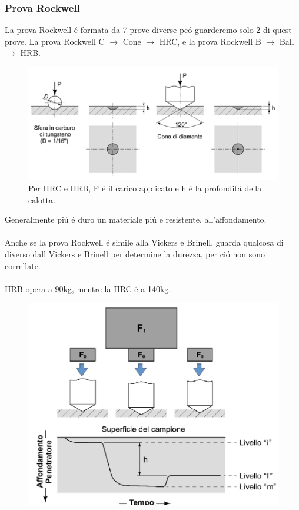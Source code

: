 \documentclass{article}
\begin{document}
{                \subsubsection{Prova Rockwell}
                    La prova Rockwell \'e formata da 7 prove diverse pe\'o guarderemo solo 2 di quest prove. La prova Rockwell C $\rightarrow$ Cone $\rightarrow$ HRC, e la prova Rockwell B $\rightarrow$ Ball $\rightarrow$ HRB.
                    \begin{figure}[!h]
                        \centering
                        \includegraphics[width=.85\linewidth]{Diagrammi per le Prova di Durezza Rockwell.png}
                        \caption{Per HRC e HRB, P \'e il carico applicato e h \'e la profondit\'a della calotta.}
                    \end{figure}
                     Generalmente pi\'u \'e duro un materiale pi\'u e resistente. all'affondamento. \\ \\
                    Anche se la prova Rockwell \'e simile alla Vickers e Brinell, guarda qualcosa di diverso dall Vickers e Brinell per determine la durezza, per ci\'o non sono correllate.\\ \\
                    HRB opera a 90kg, mentre la HRC \'e a 140kg.
                    \begin{figure}[!h]
                        \centering
                        \includegraphics[width=.85\linewidth]{Diagramma di Affondamento per la Prova di Rockwell.png}

\end{figure}}
\end{document}
